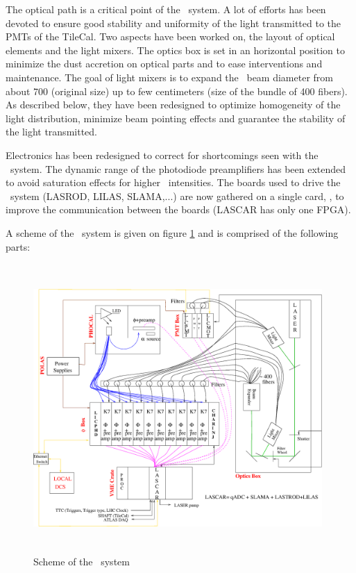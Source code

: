 \par
The optical path is a critical point of the \lasii~system. A lot of efforts has been devoted to ensure good stability and uniformity of the light transmitted to the PMTs of the TileCal. Two aspects have been worked on, the layout of optical elements and the light mixers. The optics box is set in an horizontal position to minimize the dust accretion on optical parts and to ease interventions and maintenance. The goal of light mixers is to expand the \laser~beam diameter from about 700 \mum (original size) up to few centimeters (size of the bundle of 400 fibers). As described below, they have been redesigned to optimize homogeneity of the light distribution, minimize beam pointing effects and  guarantee the stability of the light transmitted.
\par
Electronics has been redesigned to correct for shortcomings seen with the \lasi~system. The dynamic range of the photodiode preamplifiers has been extended to avoid saturation effects for higher \laser~intensities. The boards used to drive the \lasi~system (LASROD, LILAS, SLAMA,...) are now gathered on a single card, \lascar, to improve the communication between the boards (LASCAR has only one FPGA).
\par
A scheme of the \lasii~system is given on figure \ref{fig:laserscheme} and is comprised of the following parts:
\begin{figure}[htbp]
\centering
\includegraphics[width=11cm,height=11cm]{figures/LaserII_latest_latest.eps}
\caption{Scheme of the \lasii~system}\label{fig:laserscheme}
\end{figure}
